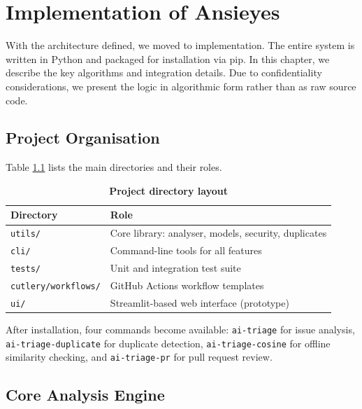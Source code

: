 \chapter{Implementation of Ansieyes}

With the architecture defined, we moved to implementation. The entire system is written in Python and packaged for installation via pip. In this chapter, we describe the key algorithms and integration details. Due to confidentiality considerations, we present the logic in algorithmic form rather than as raw source code.

\section{Project Organisation}

Table \ref{tab:projstructure} lists the main directories and their roles.

\begin{table}[htb]
\centering
\renewcommand{\arraystretch}{1.3}
\setlength{\arrayrulewidth}{0.5mm}
\fontsize{10}{12}\selectfont
\caption[Project directory layout]{\textbf{Project directory layout}}
\vspace{2mm}
\label{tab:projstructure}
\begin{tabular}{|p{3.5cm}|p{8cm}|}
\hline
\textbf{Directory} & \textbf{Role} \\
\hline
\texttt{utils/} & Core library: analyser, models, security, duplicates \\
\hline
\texttt{cli/} & Command-line tools for all features \\
\hline
\texttt{tests/} & Unit and integration test suite \\
\hline
\texttt{cutlery/workflows/} & GitHub Actions workflow templates \\
\hline
\texttt{ui/} & Streamlit-based web interface (prototype) \\
\hline
\end{tabular}
\end{table}

After installation, four commands become available: \texttt{ai-triage} for issue analysis, \texttt{ai-triage-duplicate} for duplicate detection, \texttt{ai-triage-cosine} for offline similarity checking, and \texttt{ai-triage-pr} for pull request review.

\section{Core Analysis Engine}

